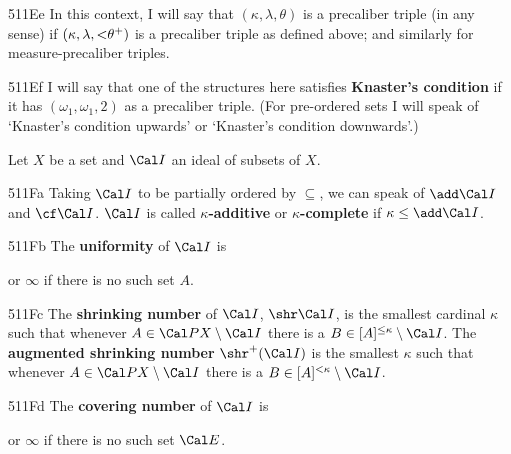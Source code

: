 \spheader 511Ee In this context, I will say that
$(\kappa,\lambda,\theta)$ is a precaliber triple (in any sense) if
$(\kappa,\lambda,\hbox{$<$}\theta^+)$ is a precaliber triple as defined
above;  and similarly for measure-precaliber triples.

\spheader 511Ef I will say that one of the structures here satisfies
{\bf Knaster's condition} if it has $(\omega_1,\omega_1,2)$ as a
precaliber triple.  (For pre-ordered sets I will speak of
`Knaster's condition upwards' or `Knaster's condition downwards'.)

 Let $X$ be a set and $\Cal I$ an ideal of
subsets of $X$.

\spheader 511Fa Taking $\Cal I$ to be partially ordered by
$\subseteq$, we can speak of $\add\Cal I$ and $\cf\Cal I$.   $\Cal I$ is called {\bf $\kappa$-additive} or
{\bf $\kappa$-complete} if $\kappa\le\add\Cal I$.


\spheader 511Fb The {\bf uniformity} of $\Cal I$ is


\noindent or $\infty$ if there is no such set $A$.   

\spheader 511Fc The {\bf shrinking number} of
$\Cal I$, $\shr\Cal I$, is the smallest cardinal $\kappa$ such that
whenever $A\in\Cal PX\setminus\Cal I$ there is a
$B\in[A]^{\le\kappa}\setminus\Cal I$.
The {\bf augmented shrinking number} $\shr^+(\Cal I)$ is the smallest
$\kappa$ such that
whenever $A\in\Cal PX\setminus\Cal I$ there is a
$B\in[A]^{<\kappa}\setminus\Cal I$.

\spheader 511Fd The {\bf covering number} of $\Cal I$ is


\noindent or $\infty$ if there is no such set $\Cal E$.

